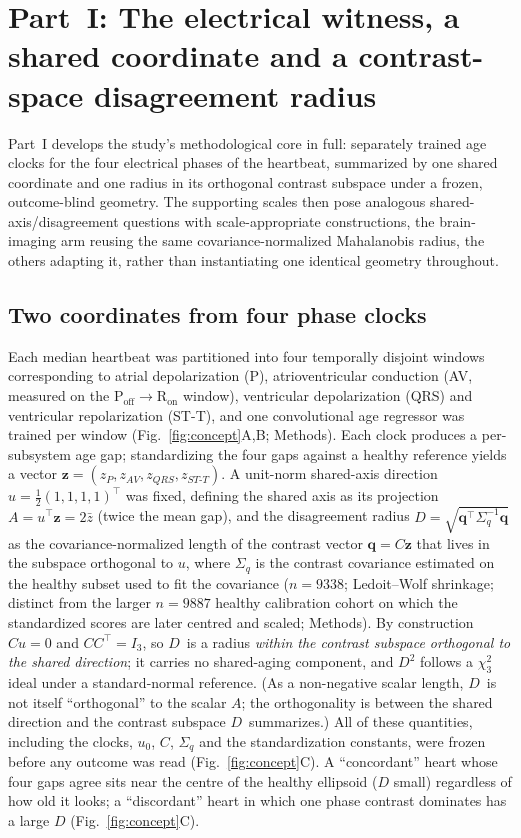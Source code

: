 \documentclass[11pt]{article}
\newcommand{\D}{\ensuremath{D}}
\newcommand{\A}{\ensuremath{A}}
\begin{document}
\section{Part~I: The electrical witness, a shared coordinate and a contrast-space disagreement radius}
\label{sec:parti}

Part~I develops the study's methodological core in full: separately trained age clocks for the
four electrical phases of the heartbeat, summarized by one shared coordinate
and one radius in its orthogonal contrast subspace under a frozen,
outcome-blind geometry. The supporting scales then pose analogous shared-axis/disagreement
questions with scale-appropriate constructions, the brain-imaging arm reusing the same
covariance-normalized Mahalanobis radius, the others adapting it, rather than instantiating one
identical geometry throughout.

\subsection{Two coordinates from four phase clocks}
\label{sec:construct}

Each median heartbeat was partitioned into four temporally disjoint windows
corresponding to atrial depolarization (P), atrioventricular conduction (AV,
measured on the $\text{P}_{\text{off}}\!\to\!\text{R}_{\text{on}}$ window),
ventricular depolarization (QRS) and ventricular repolarization (ST-T), and one
convolutional age regressor was trained per window (Fig.~\ref{fig:concept}A,B; Methods). Each
clock produces a per-subsystem age gap; standardizing the four gaps against a healthy
reference yields a vector $\mathbf{z}=(z_P,z_{AV},z_{QRS},z_{ST\text{-}T})$. A
unit-norm shared-axis direction $u=\tfrac12(1,1,1,1)^{\top}$ was fixed, defining the shared
axis as its projection $\A=u^{\top}\mathbf{z}=2\bar{z}$ (twice the mean gap), and the
disagreement radius $\D=\sqrt{\mathbf{q}^{\top}\Sigma_q^{-1}\mathbf{q}}$ as the
covariance-normalized length of the contrast vector $\mathbf{q}=C\mathbf{z}$ that lives
in the subspace orthogonal to $u$, where $\Sigma_q$ is the contrast covariance estimated
on the healthy subset used to fit the covariance ($n=\num{9338}$; Ledoit--Wolf shrinkage;
distinct from the larger $n=\num{9887}$ healthy calibration cohort on which the standardized
scores are later centred and scaled; Methods). By
construction $C u = 0$ and $CC^{\top}=I_3$, so \D\ is a radius \emph{within the contrast
subspace orthogonal to the shared direction}; it carries no shared-aging component, and
$\D^2$ follows a $\chi^2_3$ ideal under a standard-normal reference. (As a non-negative
scalar length, \D\ is not itself ``orthogonal'' to the scalar \A; the orthogonality is
between the shared direction and the contrast subspace \D\ summarizes.) All of these quantities,
including the clocks, $u_0$, $C$, $\Sigma_q$ and the standardization constants, were frozen before any outcome was
read (Fig.~\ref{fig:concept}C). A ``concordant'' heart whose four gaps agree sits near
the centre of the healthy ellipsoid ($\D$ small) regardless of how old it looks;
a ``discordant'' heart in which one phase contrast dominates has a large $\D$
(Fig.~\ref{fig:concept}C).
\end{document}

